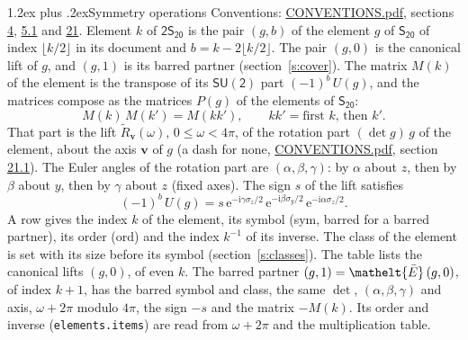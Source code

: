 \documentclass[10pt,a4paper]{article}
\makeatletter
\renewcommand\section{\@startsection{section}{1}{\z@}{-3ex plus -1ex minus -.2ex}%
  {1.2ex plus .2ex}{\normalfont\large\sffamily\bfseries\color{parttitle}}}
\numberwithin{equation}{section}
\newcommand{\eltfont}[1]{{\let\sigma\eltsigma\mathelt{#1}}}
\newcommand{\grp}[1]{\mathsf{#1}}
\newcommand{\elt}[1]{\eltfont{#1}}
\newcommand{\vv}{\mathbf{v}}
\newcommand{\iunit}{\mathrm{i}}
\newcommand{\expe}{\mathrm{e}}
\newcommand{\barred}[1]{\bar{#1}}
\newcommand{\lift}[1]{\tilde{#1}}
\newcommand{\pauli}[1]{\sigma_{#1}}
\makeatother
\begin{document}
\section{Symmetry operations}\label{s:elements}
Conventions: \href{../../CONVENTIONS.pdf}{CONVENTIONS.pdf}, sections \href{../../../rotation/CONVENTIONS.pdf\#conv.4}{4}, \href{../../../rotation/CONVENTIONS.pdf\#conv.5.1}{5.1} and \href{../../CONVENTIONS.pdf\#conv.21}{21}.
\leavevmode\label{n:index.element}\label{n:element.g}Element $k$ of $\grp{2S_{20}}$ is the pair $(g, b)$ of the element $g$ of \href{../../../rotation/data/pdf/S20.pdf}{$\grp{S_{20}}$} of index $\lfloor k/2\rfloor$ in its document and $b = k - 2\lfloor k/2\rfloor$. The pair $(g, 0)$ is the canonical lift of $g$, and $(g, 1)$ is its barred partner (section~\ref{s:cover}). \label{n:matrix.element.pin}\label{n:matrix.element}The matrix $M(k)$ of the element is the transpose of its $\grp{SU(2)}$ part $(-1)^{b}\,U(g)$, and the matrices compose as the matrices $P(g)$ of the elements of $\grp{S_{20}}$:
\begin{equation}\label{e:mprod}M(k)\,M(k') = M(kk'),\qquad kk' = \text{first } k\text{, then } k'.\end{equation}
\leavevmode\label{n:angle.omega}\label{n:vector.axis}\label{n:vector.pole}That part is the lift $\lift{R}_{\vv}(\omega)$, $0 \le \omega < 4\pi$, of the rotation part $(\det g)\,g$ of the element, about the axis $\vv$ of $g$ (a dash for none, \href{../../CONVENTIONS.pdf}{CONVENTIONS.pdf}, section \href{../../CONVENTIONS.pdf\#conv.21.1}{21.1}). \label{n:angle.euler.alpha}\label{n:angle.euler.beta}\label{n:angle.euler.gamma}\label{n:vector.coordinates}The Euler angles of the rotation part are $(\alpha,\beta,\gamma)$: by $\alpha$ about $z$, then by $\beta$ about $y$, then by $\gamma$ about $z$ (fixed axes). \label{n:local.euler.sign}The sign $s$ of the lift satisfies
\begin{equation}\label{e:euler}(-1)^{b}\,U(g) = s\,\expe^{-\iunit\gamma\pauli{z}/2}\,\expe^{-\iunit\beta\pauli{y}/2}\,\expe^{-\iunit\alpha\pauli{z}/2}.\end{equation}
\leavevmode\label{n:index.element.inverse}\label{n:head.sym}\label{n:head.ord}A row gives the index $k$ of the element, its symbol (sym, barred for a barred partner), its order (ord) and the index $k^{-1}$ of its inverse. \label{n:head.class}The class of the element is set with its size before its symbol (section~\ref{s:classes}).
The table lists the canonical lifts $(g, 0)$, of even $k$. The barred partner $(g, 1) = \elt{\barred{E}}\,(g, 0)$, of index $k + 1$, has the barred symbol and class, the same $\det$, $(\alpha,\beta,\gamma)$ and axis, $\omega + 2\pi$ modulo $4\pi$, the sign $-s$ and the matrix $-M(k)$. Its order and inverse (\texttt{elements.items}) are read from $\omega + 2\pi$ and the multiplication table.
\end{document}

